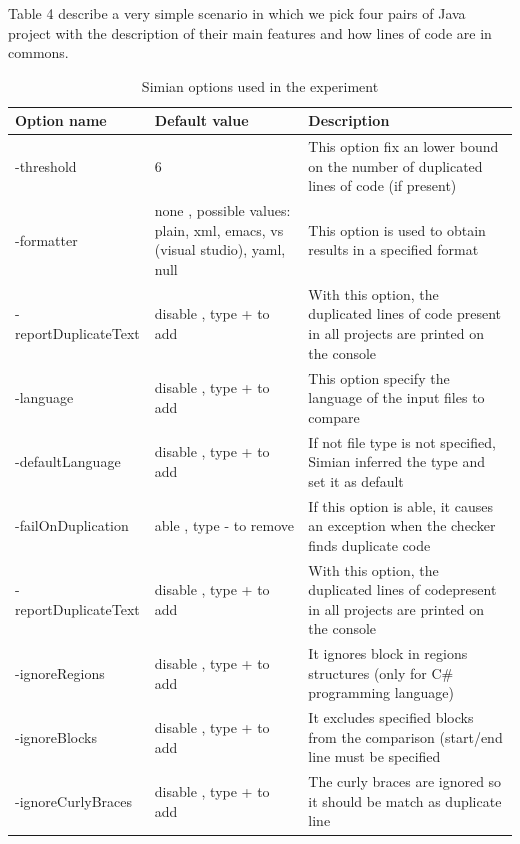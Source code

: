 Table 4 describe a very simple scenario in which we pick four pairs of Java project with the description of their main features and how lines of code are in commons.

\begin{center}
\begin{table}[!h]
  \caption{ Simian options used in the experiment }
  \label{Table:3}
\begin{adjustbox}{width=1\textwidth}
\small
\begin{tabular}{|l|p{4cm}|p{6cm}|}

\hline

 \textbf{Option name} & \textbf{Default value} & \textbf{Description} \\
\hline
 -threshold & 6 &This option fix an lower bound on the number   of duplicated lines of code (if present)  \\
\hline
-formatter &  none , possible values: plain, xml, emacs,    vs (visual studio), yaml, null &   This option is used to obtain results in a specified format\\
\hline
-reportDuplicateText & disable , type + to add &   With this option, the duplicated lines of code  present in all projects are printed on the console    \\
\hline
-language & disable , type + to add &  This option specify the  language of the input files to compare   \\
\hline
-defaultLanguage & disable , type + to add &   If not file type is not specified, Simian inferred the type and set it as default    \\
\hline
-failOnDuplication & able , type - to remove & If this option is able, it causes  an exception when the checker finds duplicate code     \\
\hline
-reportDuplicateText & disable , type + to add & With this option, the duplicated lines of codepresent in all projects are printed on the console    \\
\hline
-ignoreRegions & disable , type + to add & It ignores block in regions structures (only for C\# programming language)  \\
\hline
-ignoreBlocks & disable , type + to add &  It excludes specified blocks  from the comparison (start/end line must be specified  \\
\hline
-ignoreCurlyBraces & disable , type + to add & The curly braces are ignored  so it should be match as duplicate line \\


\end{tabular}
\end{adjustbox}
\end{table}
\end{center}
